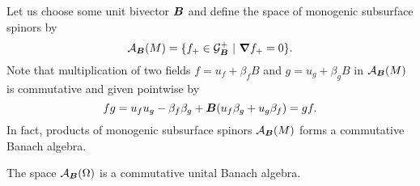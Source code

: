 Let us choose some unit bivector $\boldsymbol{B}$ and define the space of monogenic subsurface spinors by
\begin{equation}
\mathcal{A}_{\boldsymbol{B}}(M) = \{f_+ \in \mathcal{G}_{\boldsymbol{B}}^+ ~|~ \boldsymbol{\nabla} f_+ = 0\}.
\end{equation}
Note that multiplication of two fields $f=u_f+\beta_f B$ and $g=u_g+\beta_g B$ in $\mathcal{A}_{\boldsymbol{B}}(M)$ is commutative and given pointwise by
\begin{equation}
\label{eq:axial_multiplication}
fg = u_f u_g - \beta_f \beta_g + \boldsymbol{B} (u_f \beta_g + u_g \beta_f) = gf.
\end{equation}
In fact, products of monogenic subsurface spinors $\mathcal{A}_{\boldsymbol{B}}(M)$ forms a commutative Banach algebra.
\begin{proposition}
The space $\mathcal{A}_{\boldsymbol{B}}(\Omega)$ is a commutative unital Banach algebra.
\end{proposition}
